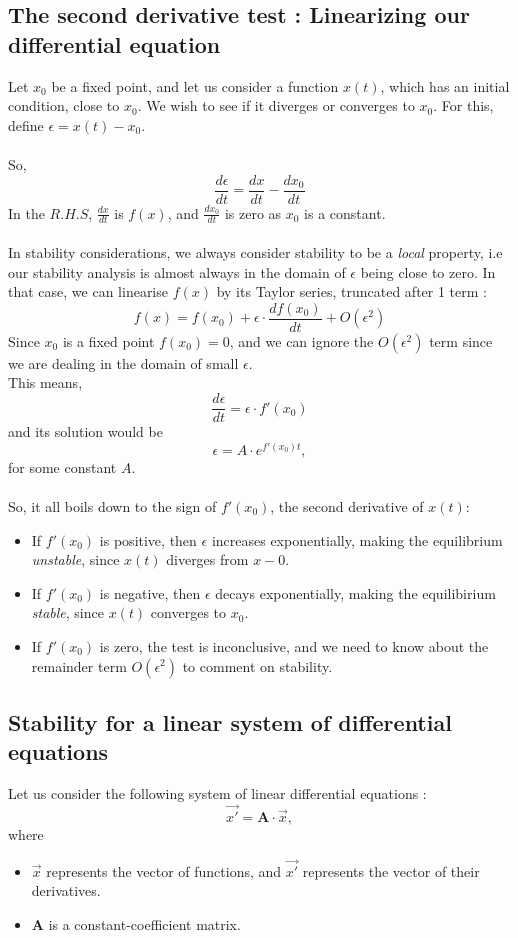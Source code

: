 \documentclass{article}
\begin{document}
\subsection{The second derivative test : Linearizing our differential equation}

Let $x_0$ be a fixed point, and let us consider a function $x(t)$, which has an initial condition, close to $x_0$. We wish to see if it diverges or converges to $x_0$.
For this, define $\epsilon = x(t) - x_0$.
\\
\\
So, $$\frac{d\epsilon}{dt} = \frac{dx}{dt} - \frac{dx_0}{dt}$$
In the $R.H.S$, $\frac{dx}{dt}$ is $f(x)$, and $\frac{dx_0}{dt}$ is zero as $x_0$ is a constant.
\\
\\
In stability considerations, we always consider stability to be a \emph{local} property, i.e our stability analysis is almost always in the domain of $\epsilon$ being close to zero. In that case, we can linearise $f(x)$ by its Taylor series, truncated after 1 term :
$$f(x) = f(x_0) + \epsilon \cdot \frac{df(x_0)}{dt} + O(\epsilon^2)$$
Since $x_0$ is a fixed point $f(x_0) = 0$, and we can ignore the $O(\epsilon ^ 2)$ term since we are dealing in the domain of small $\epsilon$.
\\
This means,
$$\frac{d\epsilon}{dt} = \epsilon \cdot f'(x_0)$$ and its solution would be 
$$\epsilon = A\cdot e^{f'(x_0)t},$$ for some constant $A$.
\\
\\
So, it all boils down to the sign of $f'(x_0)$, the second derivative of $x(t)$:
\begin{itemize}
    \item If $f'(x_0)$ is positive, then $\epsilon$ increases exponentially, making the equilibrium \emph{unstable}, since $x(t)$ diverges from $x-0$.
    \item If $f'(x_0)$ is negative, then $\epsilon$ decays exponentially, making the equilibirium \emph{stable}, since $x(t)$ converges to $x_0$.
    \item If $f'(x_0)$ is zero, the test is inconclusive, and we need to know about the remainder term $O(\epsilon ^2)$ to comment on stability.
\end{itemize}

\subsection{Stability for a linear system of differential equations}
Let us consider the following system of linear differential equations :
$$\overrightarrow{x'} = \boldsymbol{A} \cdot \overrightarrow{x},$$ where
\begin{itemize}
    \item $\overrightarrow{x}$ represents the vector of functions, and $\overrightarrow{x'}$ represents the vector of their derivatives.
    \item $\boldsymbol{A}$ is a constant-coefficient matrix.
\end{itemize}
\end{document}
